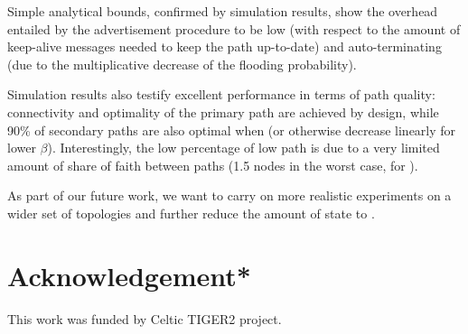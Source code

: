\documentclass[conference]{IEEEtran}
\newcommand{\Be}{\ensuremath{\beta}} \newcommand{\ML}{\ensuremath{\kappa}} \newcommand{\PB}{\ensuremath{p_b}}
\begin{document}
Simple analytical bounds, confirmed by simulation results, show the overhead entailed by the advertisement procedure to be low (with respect to the amount of keep-alive messages needed to keep the path up-to-date) and auto-terminating (due to the multiplicative decrease of the flooding probability).

Simulation results also testify excellent performance in terms of path quality:
connectivity and optimality of the primary path are achieved by design, while 90\% of secondary paths are also optimal when  (or otherwise decrease linearly for lower \Be).  Interestingly, the low percentage of low path is due to a very limited amount of share of faith between paths (1.5 nodes in the worst case, for ).

As part of our future work, we want to carry on more realistic experiments on a wider set of topologies and further reduce the amount of state to .  


\section{Acknowledgement*}
This work was funded by Celtic TIGER2 project.






\end{document}
